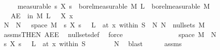 \begin{isabellebody}
\ \ \ \ \ {\isacharbrackleft}{\kern0pt}measurable{\isacharbrackright}{\kern0pt}{\isacharcolon}{\kern0pt}\ {\isachardoublequoteopen}{\isasymAnd}s{\isachardot}{\kern0pt}\ {\isacharparenleft}{\kern0pt}X\ s{\isacharparenright}{\kern0pt}\ {\isasymin}\ borel{\isacharunderscore}{\kern0pt}measurable\ M{\isachardoublequoteclose}\ {\isachardoublequoteopen}L\ {\isasymin}\ borel{\isacharunderscore}{\kern0pt}measurable\ M{\isachardoublequoteclose}\isanewline
\ \ \ {\isachardoublequoteopen}AE\ {\isasymomega}\ in\ M{\isachardot}{\kern0pt}\ L\ {\isasymomega}\ {\isacharequal}{\kern0pt}\ X\ x\ {\isasymomega}{\isachardoublequoteclose}\isanewline
%
\isadelimproof
%
\endisadelimproof
%
\isatagproof
{}\isamarkupfalse%
\ {\isacharminus}{\kern0pt}\isanewline
\ \ \isamarkupfalse%
\ N\ \ N{\isacharcolon}{\kern0pt}\ {\isachardoublequoteopen}{\isacharbraceleft}{\kern0pt}{\isasymomega}\ {\isasymin}\ space\ M{\isachardot}{\kern0pt}\ {\isasymnot}\ {\isacharparenleft}{\kern0pt}{\isacharparenleft}{\kern0pt}{\isasymlambda}s{\isachardot}{\kern0pt}\ X\ s\ {\isasymomega}{\isacharparenright}{\kern0pt}\ {\isasymlonglongrightarrow}\ L\ {\isasymomega}{\isacharparenright}{\kern0pt}\ {\isacharparenleft}{\kern0pt}at\ x\ within\ S{\isacharparenright}{\kern0pt}{\isacharbraceright}{\kern0pt}\ {\isasymsubseteq}\ N{\isachardoublequoteclose}\ {\isachardoublequoteopen}N\ {\isasymin}\ null{\isacharunderscore}{\kern0pt}sets\ M{\isachardoublequoteclose}\isanewline
\ \ \ \ \isamarkupfalse%
\ assms{\isacharparenleft}{\kern0pt}{}{\isacharparenright}{\kern0pt}{\isacharbrackleft}{\kern0pt}THEN\ AE{\isacharunderscore}{\kern0pt}E{\isacharbrackright}{\kern0pt}\ \isamarkupfalse%
\ null{\isacharunderscore}{\kern0pt}sets{\isacharunderscore}{\kern0pt}def\ \isamarkupfalse%
\ force\isanewline
\ \ \isanewline
\ \ \isacommand{{\isacharbraceleft}{\kern0pt}}\isamarkupfalse%
\isanewline
\ \ \ \ \isamarkupfalse%
\ {\isasymomega}\ \isamarkupfalse%
\ {\isachardoublequoteopen}{\isasymomega}\ {\isasymin}\ space\ M\ {\isacharminus}{\kern0pt}\ N{\isachardoublequoteclose}\isanewline
\ \ \ \ \isamarkupfalse%
\ \isamarkupfalse%
\ {\isachardoublequoteopen}{\isacharparenleft}{\kern0pt}{\isacharparenleft}{\kern0pt}{\isasymlambda}s{\isachardot}{\kern0pt}\ X\ s\ {\isasymomega}{\isacharparenright}{\kern0pt}\ {\isasymlonglongrightarrow}\ L\ {\isasymomega}{\isacharparenright}{\kern0pt}\ {\isacharparenleft}{\kern0pt}at\ x\ within\ S{\isacharparenright}{\kern0pt}{\isachardoublequoteclose}\isanewline
\ \ \ \ \ \ \isamarkupfalse%
\ N\ \isamarkupfalse%
\ blast\isanewline
\ \ \ \ \isamarkupfalse%
\ assms{\isacharparenleft}{\kern0pt}{}{\isacharparenright}{\kern0pt}\isanewline
\ \ \ \ \isamarkupfalse%
%
\endisatagproof
{\isafoldproof}%
%
\isadelimproof
\isanewline
%
\endisadelimproof
%
\isadelimtheory
\ \ \ \ \isanewline
%
\endisadelimtheory
%
\isatagtheory
{}\isamarkupfalse%
%
\endisatagtheory
{\isafoldtheory}%
%
\isadelimtheory
%
\endisadelimtheory
%
\end{isabellebody}%
